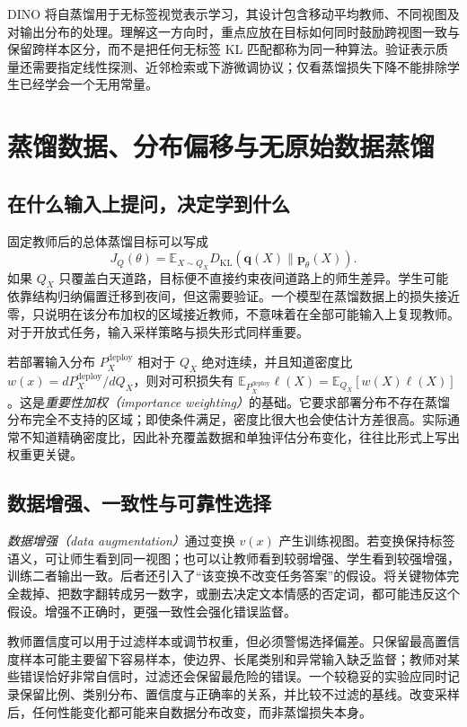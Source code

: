\documentclass[UTF8,12pt,a4paper,fontset=fandol]{ctexart}
\begin{document}
DINO 将自蒸馏用于无标签视觉表示学习\cite{caron2021}，其设计包含移动平均教师、不同视图及对输出分布的处理。理解这一方向时，重点应放在目标如何同时鼓励跨视图一致与保留跨样本区分，而不是把任何无标签 KL 匹配都称为同一种算法。验证表示质量还需要指定线性探测、近邻检索或下游微调协议；仅看蒸馏损失下降不能排除学生已经学会一个无用常量。

\section{蒸馏数据、分布偏移与无原始数据蒸馏}
\label{sec:kd-data}

\subsection{在什么输入上提问，决定学到什么}
固定教师后的总体蒸馏目标可以写成
\begin{equation}
 J_Q(\theta)=\mathbb E_{X\sim Q_X}
 D_{\mathrm{KL}}(\mathbf q(X)\|\mathbf p_\theta(X)).
 \label{eq:kd-input-distribution}
\end{equation}
如果 $Q_X$ 只覆盖白天道路，目标便不直接约束夜间道路上的师生差异。学生可能依靠结构归纳偏置迁移到夜间，但这需要验证。一个模型在蒸馏数据上的损失接近零，只说明在该分布加权的区域接近教师，不意味着在全部可能输入上复现教师。对于开放式任务，输入采样策略与损失形式同样重要。

若部署输入分布 $P_X^{\mathrm{deploy}}$ 相对于 $Q_X$ 绝对连续，并且知道密度比 $w(x)=dP_X^{\mathrm{deploy}}/dQ_X$，则对可积损失有 $\mathbb E_{P_X^{\mathrm{deploy}}}\ell(X)=\mathbb E_{Q_X}[w(X)\ell(X)]$。这是\emph{重要性加权（importance weighting）}的基础。它要求部署分布不存在蒸馏分布完全不支持的区域；即使条件满足，密度比很大也会使估计方差很高。实际通常不知道精确密度比，因此补充覆盖数据和单独评估分布变化，往往比形式上写出权重更关键。

\subsection{数据增强、一致性与可靠性选择}
\emph{数据增强（data augmentation）}通过变换 $v(x)$ 产生训练视图。若变换保持标签语义，可让师生看到同一视图；也可以让教师看到较弱增强、学生看到较强增强，训练二者输出一致。后者还引入了“该变换不改变任务答案”的假设。将关键物体完全裁掉、把数字翻转成另一数字，或删去决定文本情感的否定词，都可能违反这个假设。增强不正确时，更强一致性会强化错误监督。

教师置信度可以用于过滤样本或调节权重，但必须警惕选择偏差。只保留最高置信度样本可能主要留下容易样本，使边界、长尾类别和异常输入缺乏监督；教师对某些错误恰好非常自信时，过滤还会保留最危险的错误。一个较稳妥的实验应同时记录保留比例、类别分布、置信度与正确率的关系，并比较不过滤的基线。改变采样后，任何性能变化都可能来自数据分布改变，而非蒸馏损失本身。
\end{document}
